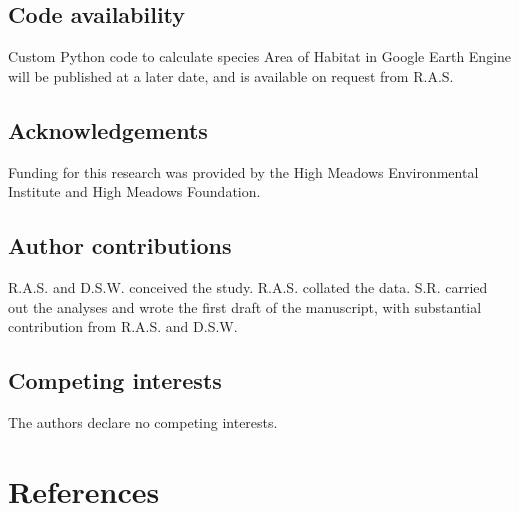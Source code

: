 \documentclass[
  12pt,
  british,
  a4paper,
]{article}
\begin{document}
\hypertarget{code-availability}{%
\subsection{Code availability}\label{code-availability}}

Custom Python code to calculate species Area of Habitat in Google Earth Engine will be published at a later date, and is available on request from R.A.S.

\hypertarget{acknowledgements}{%
\subsection{Acknowledgements}\label{acknowledgements}}

Funding for this research was provided by the High Meadows Environmental Institute and High Meadows Foundation.

\hypertarget{author-contributions}{%
\subsection{Author contributions}\label{author-contributions}}

R.A.S. and D.S.W. conceived the study. R.A.S. collated the data. S.R. carried out the analyses and wrote the first draft of the manuscript, with substantial contribution from R.A.S. and D.S.W.

\hypertarget{competing-interests}{%
\subsection{Competing interests}\label{competing-interests}}

The authors declare no competing interests.

\hypertarget{references}{%
\section{References}\label{references}}
\end{document}
